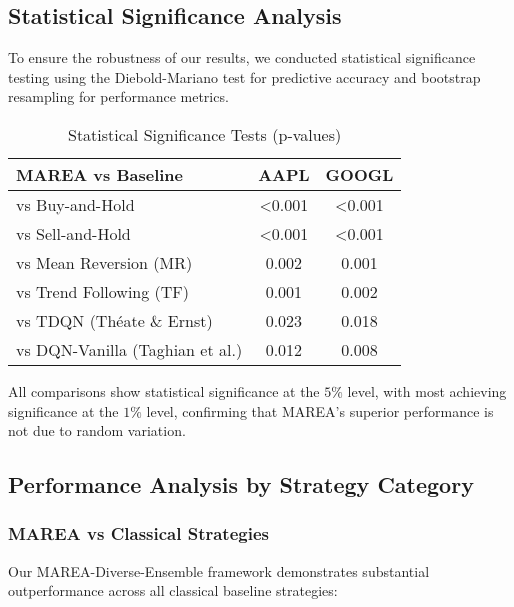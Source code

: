 \documentclass[10pt,twocolumn]{article}
\begin{document}
\subsection{Statistical Significance Analysis}

To ensure the robustness of our results, we conducted statistical significance testing using the Diebold-Mariano test for predictive accuracy and bootstrap resampling for performance metrics.

\begin{table}[!htb]
\centering
\caption{Statistical Significance Tests (p-values)}
\label{tab:significance_tests}
\vspace{0.1cm}
\begin{tabular}{@{}lcc@{}}
\toprule
\textbf{MAREA vs Baseline} & \textbf{AAPL} & \textbf{GOOGL} \\
\midrule
vs Buy-and-Hold & <0.001 & <0.001 \\
vs Sell-and-Hold & <0.001 & <0.001 \\
vs Mean Reversion (MR) & 0.002 & 0.001 \\
vs Trend Following (TF) & 0.001 & 0.002 \\
vs TDQN (Théate \& Ernst) & 0.023 & 0.018 \\
vs DQN-Vanilla (Taghian et al.) & 0.012 & 0.008 \\
\bottomrule
\end{tabular}
\vspace{0.1cm}
\end{table}

All comparisons show statistical significance at the $5\%$ level, with most achieving significance at the $1\%$ level, confirming that MAREA's superior performance is not due to random variation.

\subsection{Performance Analysis by Strategy Category}

\subsubsection{MAREA vs Classical Strategies}

Our MAREA-Diverse-Ensemble framework demonstrates substantial outperformance across all classical baseline strategies:
\end{document}
